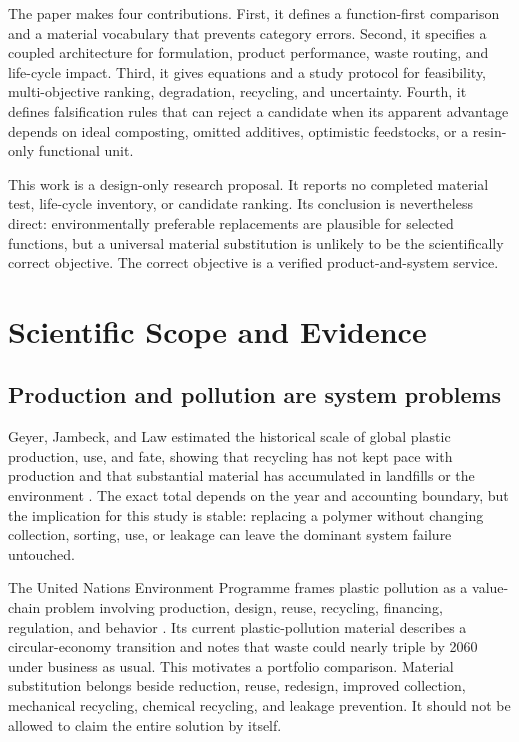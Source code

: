 \documentclass[conference]{IEEEtran}
\begin{document}
The paper makes four contributions. First, it defines a function-first comparison and a material vocabulary that prevents category errors. Second, it specifies a coupled architecture for formulation, product performance, waste routing, and life-cycle impact. Third, it gives equations and a study protocol for feasibility, multi-objective ranking, degradation, recycling, and uncertainty. Fourth, it defines falsification rules that can reject a candidate when its apparent advantage depends on ideal composting, omitted additives, optimistic feedstocks, or a resin-only functional unit.

This work is a design-only research proposal. It reports no completed material test, life-cycle inventory, or candidate ranking. Its conclusion is nevertheless direct: environmentally preferable replacements are plausible for selected functions, but a universal material substitution is unlikely to be the scientifically correct objective. The correct objective is a verified product-and-system service.

\section{Scientific Scope and Evidence}

\subsection{Production and pollution are system problems}

Geyer, Jambeck, and Law estimated the historical scale of global plastic production, use, and fate, showing that recycling has not kept pace with production and that substantial material has accumulated in landfills or the environment \cite{geyer}. The exact total depends on the year and accounting boundary, but the implication for this study is stable: replacing a polymer without changing collection, sorting, use, or leakage can leave the dominant system failure untouched.

The United Nations Environment Programme frames plastic pollution as a value-chain problem involving production, design, reuse, recycling, financing, regulation, and behavior \cite{unep}. Its current plastic-pollution material describes a circular-economy transition and notes that waste could nearly triple by 2060 under business as usual. This motivates a portfolio comparison. Material substitution belongs beside reduction, reuse, redesign, improved collection, mechanical recycling, chemical recycling, and leakage prevention. It should not be allowed to claim the entire solution by itself.
\end{document}
